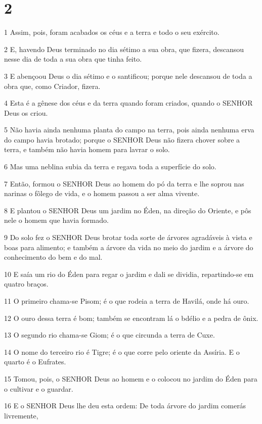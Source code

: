 \chapter{2}

\par 1 Assim, pois, foram acabados os céus e a terra e todo o seu exército.
\par 2 E, havendo Deus terminado no dia sétimo a sua obra, que fizera, descansou nesse dia de toda a sua obra que tinha feito.
\par 3 E abençoou Deus o dia sétimo e o santificou; porque nele descansou de toda a obra que, como Criador, fizera.
\par 4 Esta é a gênese dos céus e da terra quando foram criados, quando o SENHOR Deus os criou.
\par 5 Não havia ainda nenhuma planta do campo na terra, pois ainda nenhuma erva do campo havia brotado; porque o SENHOR Deus não fizera chover sobre a terra, e também não havia homem para lavrar o solo.
\par 6 Mas uma neblina subia da terra e regava toda a superfície do solo.
\par 7 Então, formou o SENHOR Deus ao homem do pó da terra e lhe soprou nas narinas o fôlego de vida, e o homem passou a ser alma vivente.
\par 8 E plantou o SENHOR Deus um jardim no Éden, na direção do Oriente, e pôs nele o homem que havia formado.
\par 9 Do solo fez o SENHOR Deus brotar toda sorte de árvores agradáveis à vista e boas para alimento; e também a árvore da vida no meio do jardim e a árvore do conhecimento do bem e do mal.
\par 10 E saía um rio do Éden para regar o jardim e dali se dividia, repartindo-se em quatro braços.
\par 11 O primeiro chama-se Pisom; é o que rodeia a terra de Havilá, onde há ouro.
\par 12 O ouro dessa terra é bom; também se encontram lá o bdélio e a pedra de ônix.
\par 13 O segundo rio chama-se Giom; é o que circunda a terra de Cuxe.
\par 14 O nome do terceiro rio é Tigre; é o que corre pelo oriente da Assíria. E o quarto é o Eufrates.
\par 15 Tomou, pois, o SENHOR Deus ao homem e o colocou no jardim do Éden para o cultivar e o guardar.
\par 16 E o SENHOR Deus lhe deu esta ordem: De toda árvore do jardim comerás livremente,
